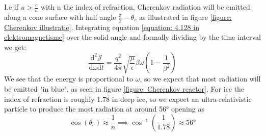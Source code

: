 \documentclass[11pt,a4paper,faculty=we,language=en,doctype=report]{cls/ugent-doc}
\begin{document}
I.e if $u>\frac{c}{n}$ with n the index of refraction, Cherenkov radiation will be emitted along a cone surface with half angle $\frac{\pi}{2}-\theta_c$ as illustrated in figure \ref{figure: Cherenkov illustratie}. Integrating equation \ref{equation: 4.128 in elektromagnetisme} over the solid angle and formally dividing by the time interval we get:
\begin{equation}
	\frac{\text{d}^2\mathscr{J}}{\text{d}\omega \text{d}t} = \frac{q^2}{4\pi}\sqrt{\frac{\mu}{\epsilon}}\beta\omega\left(1-\frac{1}{\beta^2}\right)	
\end{equation}
We see that the energy is proportional to $\omega$, so we expect that most
radiation will be emitted "in blue", as seen in figure \ref{figure: Cherenkov
reactor}.  For ice the index of refraction is roughly 1.78 in deep ice, so we
expect an ultra-relativistic particle to produce the most radiation at around
56° opening as 
\begin{equation}
	\cos(\theta_c) \approx \frac{1}{n} \implies \cos^{-1}\left(\frac{1}{1.78}\right)\approx 56\text{°}
\end{equation}
\end{document}
